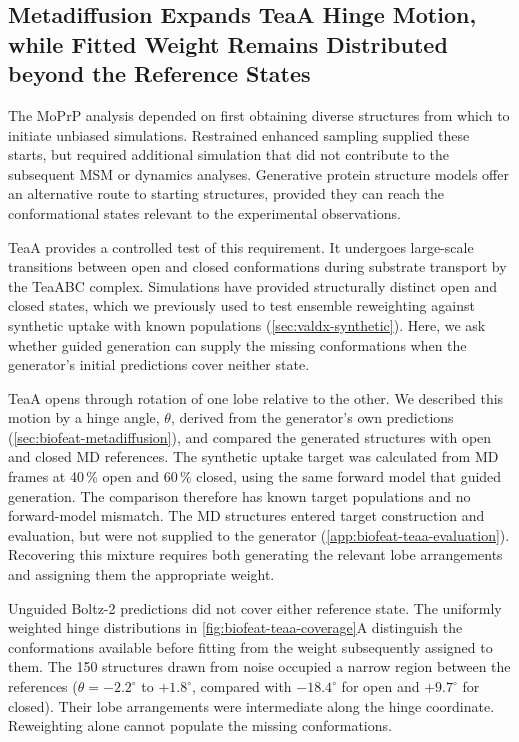 \subsection{Metadiffusion Expands TeaA Hinge Motion, while Fitted Weight Remains Distributed beyond the Reference States}
\label{sec:biofeat-teaa-results}

The MoPrP analysis depended on first obtaining diverse structures from which to initiate unbiased simulations. Restrained enhanced sampling supplied these starts, but required additional simulation that did not contribute to the subsequent MSM or dynamics analyses. Generative protein structure models offer an alternative route to starting structures, provided they can reach the conformational states relevant to the experimental observations.

TeaA provides a controlled test of this requirement. It undergoes large-scale transitions between open and closed conformations during substrate transport by the TeaABC complex. Simulations have provided structurally distinct open and closed states, which we previously used to test ensemble reweighting against synthetic uptake with known populations (\cref{sec:valdx-synthetic}).\supercite{marinelliEvidenceAllostericMechanism2011,leeInterpretingHydrogenDeuteriumExchange2021} Here, we ask whether guided generation can supply the missing conformations when the generator's initial predictions cover neither state.

TeaA opens through rotation of one lobe relative to the other. We described this motion by a hinge angle, $\theta$, derived from the generator's own predictions (\cref{sec:biofeat-metadiffusion}), and compared the generated structures with open and closed MD references. The synthetic uptake target was calculated from MD frames at 40\,\% open and 60\,\% closed, using the same forward model that guided generation. The comparison therefore has known target populations and no forward-model mismatch. The MD structures entered target construction and evaluation, but were not supplied to the generator (\cref{app:biofeat-teaa-evaluation}). Recovering this mixture requires both generating the relevant lobe arrangements and assigning them the appropriate weight.

Unguided Boltz-2 predictions did not cover either reference state. The uniformly weighted hinge distributions in \cref{fig:biofeat-teaa-coverage}A distinguish the conformations available before fitting from the weight subsequently assigned to them. The 150 structures drawn from noise occupied a narrow region between the references ($\theta=-2.2^\circ$ to $+1.8^\circ$, compared with $-18.4^\circ$ for open and $+9.7^\circ$ for closed). Their lobe arrangements were intermediate along the hinge coordinate. Reweighting alone cannot populate the missing conformations.

